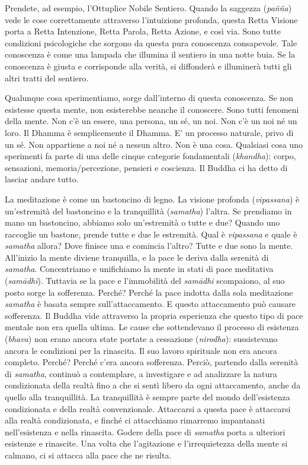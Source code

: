 Prendete, ad esempio, l'Ottuplice Nobile Sentiero. Quando la saggezza
(\emph{pañña}) vede le cose correttamente attraverso l'intuizione
profonda, questa Retta Visione porta a Retta Intenzione, Retta Parola,
Retta Azione, e così via. Sono tutte condizioni psicologiche che sorgono
da questa pura conoscenza consapevole. Tale conoscenza è come una
lampada che illumina il sentiero in una notte buia. Se la conoscenza è
giusta e corrisponde alla verità, si diffonderà e illuminerà tutti gli
altri tratti del sentiero.

Qualunque cosa sperimentiamo, sorge dall'interno di questa conoscenza.
Se non esistesse questa mente, non esisterebbe neanche il conoscere.
Sono tutti fenomeni della mente. Non c'è un essere, una persona, un sé,
un noi. Non c'è un noi né un loro. Il Dhamma è semplicemente il Dhamma.
E' un processo naturale, privo di un sé. Non appartiene a noi né a
nessun altro. Non è una cosa. Qualsiasi cosa uno sperimenti fa parte di
una delle cinque categorie fondamentali (\emph{khandha}): corpo,
sensazioni, memoria/percezione, pensieri e coscienza. Il Buddha ci ha
detto di lasciar andare tutto.

La meditazione è come un bastoncino di legno. La visione profonda
(\emph{vipassana}) è un'estremità del bastoncino e la tranquillità
(\emph{samatha}) l'altra. Se prendiamo in mano un bastoncino, abbiamo
solo un'estremità o tutte e due? Quando uno raccoglie un bastone, prende
tutte e due le estremità. Qual è \emph{vipassana} e quale è \emph{samatha} allora?
Dove finisce una e comincia l'altro? Tutte e due sono la mente.
All'inizio la mente diviene tranquilla, e la pace le deriva dalla
serenità di \emph{samatha}. Concentriamo e unifichiamo la mente in stati di
pace meditativa (\emph{samādhi}). Tuttavia se la pace e l'immobilità del
\emph{samādhi} scompaiono, al suo posto sorge la sofferenza. Perché? Perché la
pace indotta dalla sola meditazione \emph{samatha} è basata sempre
sull'attaccamento. E questo attaccamento può causare sofferenza. Il
Buddha vide attraverso la propria esperienza che questo tipo di pace
mentale non era quella ultima. Le cause che sottendevano il processo di
esistenza (\emph{bhava}) non erano ancora state portate a cessazione
(\emph{nirodha}): sussistevano ancora le condizioni per la rinascita. Il
suo lavoro spirituale non era ancora completo. Perché? Perché c'era
ancora sofferenza. Perciò, partendo dalla serenità di \emph{samatha}, continuò
a contemplare, a investigare e ad analizzare la natura condizionata
della realtà fino a che si sentì libero da ogni attaccamento, anche da
quello alla tranquillità. La tranquillità è sempre parte del mondo
dell'esistenza condizionata e della realtà convenzionale. Attaccarsi a
questa pace è attaccarsi alla realtà condizionata, e finché ci
attacchiamo rimarremo impantanati nell'esistenza e nella rinascita.
Godere della pace di \emph{samatha} porta a ulteriori esistenze e rinascite.
Una volta che l'agitazione e l'irrequietezza della mente si calmano, ci
si attacca alla pace che ne risulta.

